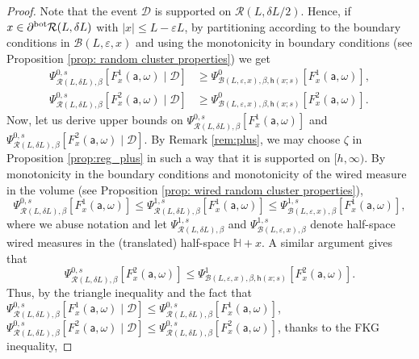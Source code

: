 \documentclass[11pt,a4paper]{article}
\numberwithin{equation}{section}
\theoremstyle{plain}
\theoremstyle{definition}
\begin{document}
\begin{proof}
Note that the event $\mathcal{D}$ is supported on $\mathcal{R}(L,\delta L/2)$.
Hence, if $x\in \partial^{\rm bot}\mathcal{R}(L,\delta L)$ with $|x|\leq L-\varepsilon L$, by partitioning according to the boundary conditions in $\mathcal{B}(L,\varepsilon,x)$ and using the monotonicity in boundary conditions (see Proposition \ref{prop: random cluster properties}) we get
\begin{align}\label{eq: F 1 lower bound}
\Psi^{0,s}_{\mathcal R(L,\delta L),\beta}[F^1_x(\mathsf{a},\omega) \mid  \mathcal{D}]&\geq \Psi^{0}_{\mathcal{B}(L,\varepsilon,x),\beta,\mathsf{h}(x;s)}[F^1_x(\mathsf{a},\omega)],
\\ \label{eq: F 2 lower bound}
\Psi^{0,s}_{\mathcal R(L,\delta L),\beta}[F^2_x(\mathsf{a},\omega)\mid  \mathcal{D}]
&\geq  \Psi^{0}_{\mathcal{B}(L,\varepsilon,x),\beta,\mathsf{h}(x;s)}[F^2_x(\mathsf{a},\omega)].
\end{align}
Now, let us derive upper bounds on $\Psi^{0,s}_{\mathcal R(L,\delta L),\beta}[F^1_x(\mathsf{a},\omega) ]$ and $\Psi^{0,s}_{\mathcal R(L,\delta L),\beta}[F^2_x(\mathsf{a},\omega)\mid  \mathcal{D}]$. By Remark \ref{rem:plus}, we may choose $\zeta$ in Proposition \ref{prop:reg_plus} in such a way that it is supported on $[h,\infty)$.
By monotonicity in the boundary conditions and monotonicity of the wired measure in the volume (see Proposition \ref{prop: wired random cluster properties}),
\begin{equation} \label{eq: F 1 upper bound}
\Psi^{0,s}_{\mathcal R(L,\delta L),\beta}[F^1_x(\mathsf{a},\omega)]
\leq \Psi^{1,s}_{\mathcal R(L,\delta L),\beta}[F^1_x(\mathsf{a},\omega)]\leq \Psi^{1,s}_{\mathcal{B}(L,\varepsilon,x),\beta}[F^1_x(\mathsf{a},\omega)],
\end{equation}  
where we abuse notation and let $\Psi^{1,s}_{\mathcal R(L,\delta L),\beta}$ and $\Psi^{1,s}_{\mathcal{B}(L,\varepsilon,x),\beta}$ denote half-space wired measures in the (translated) half-space 
$\mathbb H+x$. 
A similar argument gives that
\begin{equation} \label{eq: F 2 upper bound}
\Psi^{0,s}_{\mathcal R(L,\delta L),\beta}[F^2_x(\mathsf{a},\omega) ]\leq \Psi^{1}_{\mathcal{B}(L,\varepsilon,x),\beta,\mathsf{h}(x;s)}[F^2_x(\mathsf{a},\omega)].
\end{equation}
Thus, by the triangle inequality and the fact that $\Psi^{0,s}_{\mathcal R(L,\delta L),\beta}[F^1_x(\mathsf{a},\omega) \mid  \mathcal{D}]\leq \Psi^{0,s}_{\mathcal R(L,\delta L),\beta}[F^1_x(\mathsf{a},\omega)]$, $\Psi^{0,s}_{\mathcal R(L,\delta L),\beta}[F^2_x(\mathsf{a},\omega) \mid  \mathcal{D}]\leq \Psi^{0,s}_{\mathcal R(L,\delta L),\beta}[F^2_x(\mathsf{a},\omega)]$, thanks to the FKG inequality,

\end{proof}
\end{document}
